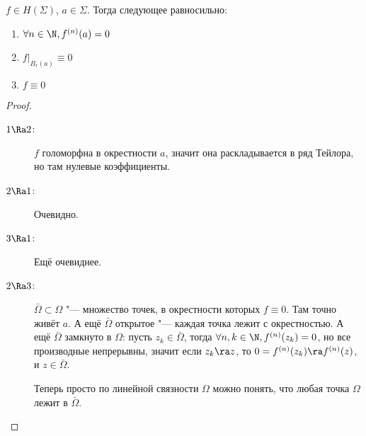 \begin{theorem}
	$f \in H(\Sigma)$, $a \in \Sigma$.
	Тогда следующее равносильно:
	\begin{enumerate}
		\item $\forall n \in \N, f^{(n)}(a) = 0$
		\item $f\bigr|_{B_r(a)} \equiv 0$
		\item $f \equiv 0$
	\end{enumerate}
\end{theorem}
\begin{proof}\begin{description}
\item[$1 \Ra 2$:]
	$f$ голоморфна в окрестности $a$, значит она раскладывается в ряд Тейлора, но там нулевые коэффициенты.

\item[$2 \Ra 1$:]
	Очевидно.

\item[$3 \Ra 1$:]
	Ещё очевиднее.

\item[$2 \Ra 3$:]
	$\bar \Omega \subset \Omega$ "--- множество точек, в окрестности которых $f \equiv 0$.
	Там точно живёт $a$.
	А ещё $\bar \Omega$ открытое "--- каждая точка лежит с окрестностью.
	А ещё $\bar \Omega$ замкнуто в $\Omega$: пусть $z_k \in \bar \Omega$, тогда $\forall n,k \in \N, f^{(n)}(z_k) = 0$,
	но все производные непрерывны, значит если $z_k \ra z$, то $0 = f^{(n)}(z_k) \ra f^{(n)}(z)$, и $z \in \bar \Omega$.

	Теперь просто по линейной связности $\Omega$ можно понять, что любая точка $\Omega$ лежит в $\bar \Omega$.
\end{description}\end{proof}
